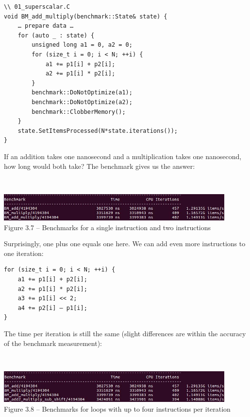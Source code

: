 \begin{lstlisting}[style=styleCXX]
\\ 01_superscalar.C
void BM_add_multiply(benchmark::State& state) {
	… prepare data …
	for (auto _ : state) {
		unsigned long a1 = 0, a2 = 0;
		for (size_t i = 0; i < N; ++i) {
			a1 += p1[i] + p2[i];
			a2 += p1[i] * p2[i];
		}
		benchmark::DoNotOptimize(a1);
		benchmark::DoNotOptimize(a2);
		benchmark::ClobberMemory();
	}
	state.SetItemsProcessed(N*state.iterations());
}
\end{lstlisting}

If an addition takes one nanosecond and a multiplication takes one nanosecond, how long would both take? The benchmark gives us the answer:

\hspace*{\fill} \\ %
\begin{center}
\includegraphics[width=0.9\textwidth]{content/1/chapter3/images/7.jpg}\\
Figure 3.7 – Benchmarks for a single instruction and two instructions
\end{center}

Surprisingly, one plus one equals one here. We can add even more instructions to one iteration:

\begin{lstlisting}[style=styleCXX]
for (size_t i = 0; i < N; ++i) {
	a1 += p1[i] + p2[i];
	a2 += p1[i] * p2[i];
	a3 += p1[i] << 2;
	a4 += p2[i] – p1[i];
}
\end{lstlisting}

The time per iteration is still the same (slight differences are within the accuracy of the benchmark measurement):

\hspace*{\fill} \\ %
\begin{center}
\includegraphics[width=0.9\textwidth]{content/1/chapter3/images/8.jpg}\\
Figure 3.8 – Benchmarks for loops with up to four instructions per iteration
\end{center}


